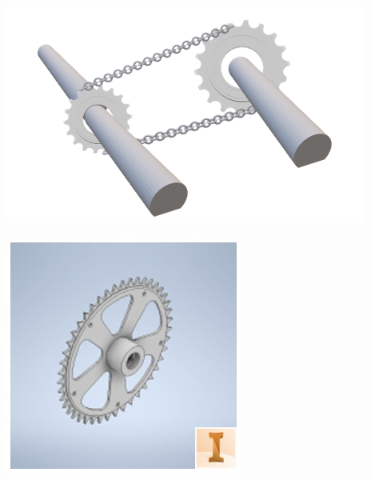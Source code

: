 \begin{center}
\includegraphics[width=.6\linewidth]{A/figs/C_2.png} 
\end{center}

\begin{center}
\includegraphics[width=.6\linewidth]{A/figs/elements/A_5.jpeg} 
 

\end{center}

